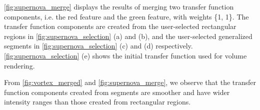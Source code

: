\documentclass[twoside,twocolumn,10pt]{article}
\begin{document}


\autoref{fig:supernova_merge} displays the results of merging two transfer function components, i.e. the red feature and the green feature, with weights \{1, 1\}. The transfer function components are created from the user-selected rectangular regions in \autoref{fig:supernova_selection} (a) and (b), and the user-selected generalized segments in \autoref{fig:supernova_selection} (c) and (d) respectively. \autoref{fig:supernova_selection} (e) shows the initial transfer function used for volume rendering.

From \autoref{fig:vortex_merged} and \autoref{fig:supernova_merge}, we observe that the transfer function components created from segments are smoother and have wider intensity ranges than those created from rectangular regions.
\end{document}
